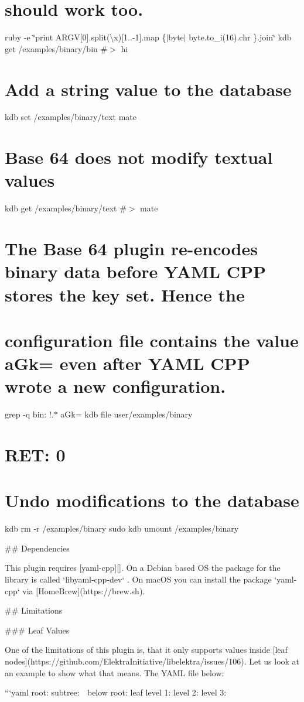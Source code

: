 \section*{should work too.}

ruby -\/e \char`\"{}print A\+R\+G\+V\mbox{[}0\mbox{]}.\+split(\textquotesingle{}\textbackslash{}x\textquotesingle{})\mbox{[}1..-\/1\mbox{]}.\+map \{$\vert$byte$\vert$ byte.\+to\+\_\+i(16).\+chr \}.\+join\char`\"{} {\ttfamily kdb get /examples/binary/bin} \#$>$ hi

\section*{Add a string value to the database}

kdb set /examples/binary/text mate \section*{Base 64 does not modify textual values}

kdb get /examples/binary/text \#$>$ mate

\section*{The Base 64 plugin re-\/encodes binary data before Y\+A\+ML C\+PP stores the key set. Hence the}

\section*{configuration file contains the value {\ttfamily a\+Gk=} even after Y\+A\+ML C\+PP wrote a new configuration.}

grep -\/q \textquotesingle{}bin\+: !.$\ast$ a\+Gk=\textquotesingle{} {\ttfamily kdb file user/examples/binary} \section*{R\+ET\+: 0}

\section*{Undo modifications to the database}

kdb rm -\/r /examples/binary sudo kdb umount /examples/binary 
\begin{DoxyCode}
## Dependencies

This plugin requires [yaml-cpp][]. On a Debian based OS the package for the library is called
       `libyaml-cpp-dev` . On macOS you can install the package `yaml-cpp` via [HomeBrew](https://brew.sh).

## Limitations

### Leaf Values

One of the limitations of this plugin is, that it only supports values inside [leaf
       nodes](https://github.com/ElektraInitiative/libelektra/issues/106). Let us look at an example to show what that means. The YAML
       file below:

```yaml
root:
  subtree:    🍂
  below root: leaf
level 1:
  level 2:
    level 3:  🍁
\end{DoxyCode}



